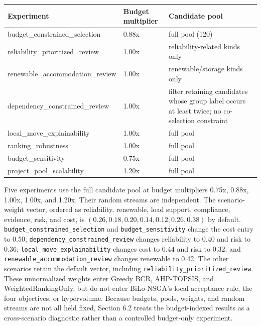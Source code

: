 \documentclass[
]{article}
\begin{document}
\begin{longtable}[]{@{}
  >{\raggedright\arraybackslash}p{}
  >{\raggedright\arraybackslash}p{}
  >{\raggedright\arraybackslash}p{}@{}}
\toprule\noalign{}
\begin{minipage}[b]{\linewidth}\raggedright
Experiment
\end{minipage} & \begin{minipage}[b]{\linewidth}\raggedright
Budget multiplier
\end{minipage} & \begin{minipage}[b]{\linewidth}\raggedright
Candidate pool
\end{minipage} \\
\midrule\noalign{}
\endhead
\bottomrule\noalign{}
\endlastfoot
budget\_constrained\_selection & 0.88x & full pool (120) \\
reliability\_prioritized\_review & 1.00x & reliability-related kinds only \\
renewable\_accommodation\_review & 1.00x & renewable/storage kinds only \\
dependency\_constrained\_review & 1.00x & filter retaining candidates whose group label occurs at least twice; no co-selection constraint \\
local\_move\_explainability & 1.00x & full pool \\
ranking\_robustness & 1.00x & full pool \\
budget\_sensitivity & 0.75x & full pool \\
project\_pool\_scalability & 1.20x & full pool \\
\end{longtable}

Five experiments use the full candidate pool at budget multipliers 0.75x, 0.88x, 1.00x, 1.00x, and 1.20x. Their random streams are independent. The scenario-weight vector, ordered as reliability, renewable, load support, compliance, evidence, risk, and cost, is \((0.26,0.18,0.20,0.14,0.12,0.26,0.38)\) by default. \texttt{budget\_constrained\_selection} and \texttt{budget\_sensitivity} change the cost entry to 0.50; \texttt{dependency\_constrained\_review} changes reliability to 0.40 and risk to 0.36; \texttt{local\_move\_explainability} changes cost to 0.44 and risk to 0.32; and \texttt{renewable\_accommodation\_review} changes renewable to 0.42. The other scenarios retain the default vector, including \texttt{reliability\_prioritized\_review}. These unnormalized weights enter Greedy BCR, AHP-TOPSIS, and WeightedRankingOnly, but do not enter BiLo-NSGA's local acceptance rule, the four objectives, or hypervolume. Because budgets, pools, weights, and random streams are not all held fixed, Section 6.2 treats the budget-indexed results as a cross-scenario diagnostic rather than a controlled budget-only experiment.
\end{document}
